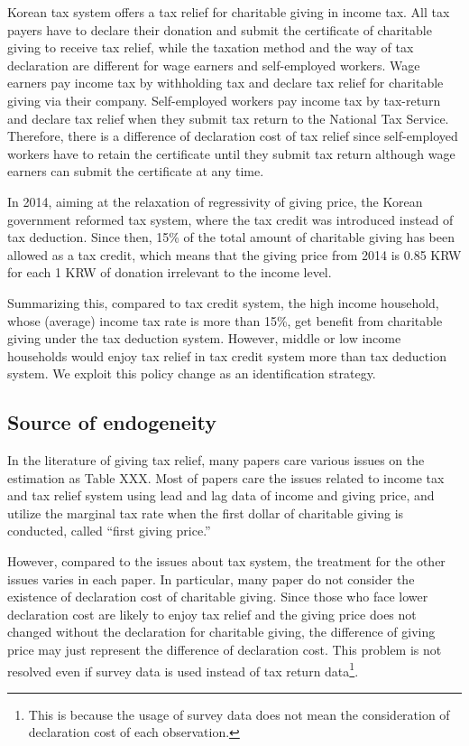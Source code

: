 \documentclass[
  11pt,
  a4paper,
]{article}
\begin{document}
Korean tax system offers a tax relief for charitable giving in income tax. All tax payers have to declare their donation and submit the certificate of charitable giving to receive tax relief, while the taxation method and the way of tax declaration are different for wage earners and self-employed workers. Wage earners pay income tax by withholding tax and declare tax relief for charitable giving via their company. Self-employed workers pay income tax by tax-return and declare tax relief when they submit tax return to the National Tax Service. Therefore, there is a difference of declaration cost of tax relief since self-employed workers have to retain the certificate until they submit tax return although wage earners can submit the certificate at any time.

In 2014, aiming at the relaxation of regressivity of giving price, the Korean government reformed tax system, where the tax credit was introduced instead of tax deduction. Since then, 15\% of the total amount of charitable giving has been allowed as a tax credit, which means that the giving price from 2014 is 0.85 KRW for each 1 KRW of donation irrelevant to the income level.

Summarizing this, compared to tax credit system, the high income household, whose (average) income tax rate is more than 15\%, get benefit from charitable giving under the tax deduction system. However, middle or low income households would enjoy tax relief in tax credit system more than tax deduction system. We exploit this policy change as an identification strategy.

\hypertarget{source-of-endogeneity}{%
\subsection{Source of endogeneity}\label{source-of-endogeneity}}

In the literature of giving tax relief, many papers care various issues on the estimation as Table XXX. Most of papers care the issues related to income tax and tax relief system using lead and lag data of income and giving price, and utilize the marginal tax rate when the first dollar of charitable giving is conducted, called ``first giving price.''

However, compared to the issues about tax system, the treatment for the other issues varies in each paper. In particular, many paper do not consider the existence of declaration cost of charitable giving. Since those who face lower declaration cost are likely to enjoy tax relief and the giving price does not changed without the declaration for charitable giving, the difference of giving price may just represent the difference of declaration cost. This problem is not resolved even if survey data is used instead of tax return data\footnote{This is because the usage of survey data does not mean the consideration of declaration cost of each observation.}.
\end{document}

